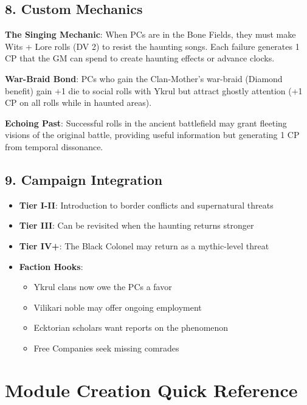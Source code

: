\documentclass[11pt]{article}
\begin{document}
\subsection*{8. Custom Mechanics}

\begin{mdframed}[backgroundcolor=modulebg]
\textbf{The Singing Mechanic}: When PCs are in the Bone Fields, they must make Wits + Lore rolls (DV 2) to resist the haunting songs. Each failure generates 1 CP that the GM can spend to create haunting effects or advance clocks.

\textbf{War-Braid Bond}: PCs who gain the Clan-Mother's war-braid (Diamond benefit) gain +1 die to social rolls with Ykrul but attract ghostly attention (+1 CP on all rolls while in haunted areas).

\textbf{Echoing Past}: Successful rolls in the ancient battlefield may grant fleeting visions of the original battle, providing useful information but generating 1 CP from temporal dissonance.
\end{mdframed}

\subsection*{9. Campaign Integration}

\begin{itemize}[leftmargin=*]
\item \textbf{Tier I-II}: Introduction to border conflicts and supernatural threats
\item \textbf{Tier III}: Can be revisited when the haunting returns stronger
\item \textbf{Tier IV+}: The Black Colonel may return as a mythic-level threat
\item \textbf{Faction Hooks}: 
\begin{itemize}
\item Ykrul clans now owe the PCs a favor
\item Vilikari noble may offer ongoing employment
\item Ecktorian scholars want reports on the phenomenon
\item Free Companies seek missing comrades
\end{itemize}
\end{itemize}

\section*{Module Creation Quick Reference}
\end{document}
